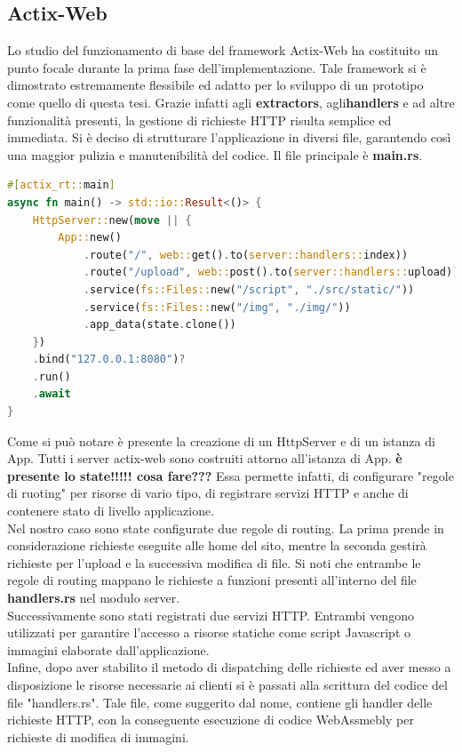 \subsection{Actix-Web}
Lo studio del funzionamento di base del framework Actix-Web ha costituito un punto focale durante la prima fase dell'implementazione.
Tale framework si è dimostrato estremamente flessibile ed adatto per lo sviluppo di un prototipo come quello di questa tesi. Grazie infatti agli \textbf{extractors}, agli\textbf{handlers} e ad altre funzionalità presenti, la gestione di richieste HTTP risulta semplice ed immediata.
Si è deciso di strutturare l'applicazione in diversi file, garantendo così una maggior pulizia e manutenibilità del codice. Il file principale è \textbf{main.rs}.
\begin{lstlisting}[language=rust, label=lst:RustWasi, caption={Porzione del file main.rs}, showstringspaces=false]
#[actix_rt::main]
async fn main() -> std::io::Result<()> {
    HttpServer::new(move || {
        App::new()
            .route("/", web::get().to(server::handlers::index))
            .route("/upload", web::post().to(server::handlers::upload))
            .service(fs::Files::new("/script", "./src/static/"))
            .service(fs::Files::new("/img", "./img/"))
            .app_data(state.clone())
    })
    .bind("127.0.0.1:8080")?
    .run()
    .await
}
\end{lstlisting}
Come si può notare è presente la creazione di un HttpServer e di un istanza di App. Tutti i server actix-web sono costruiti attorno all'istanza di App.
\textbf{è presente lo state!!!!! cosa fare???} Essa permette infatti, di configurare "regole di ruoting" per risorse di vario tipo, di registrare servizi HTTP e anche di contenere stato di livello applicazione. 
\\Nel nostro caso sono state configurate due regole di routing. La prima prende in considerazione richieste eseguite alle home del sito, mentre la seconda gestirà richieste per l'upload e la successiva modifica di file. Si noti che entrambe le regole di routing mappano le richieste a funzioni presenti all'interno del file \textbf{handlers.rs} nel modulo server.
\\Successivamente sono stati registrati due servizi HTTP. Entrambi vengono utilizzati per garantire l'accesso a risorse statiche come script Javascript o immagini elaborate dall'applicazione.
\\Infine, dopo aver stabilito il metodo di dispatching delle richieste ed aver messo a disposizione le risorse necessarie ai clienti si è passati alla scrittura del codice del file "handlers.rs". Tale file, come suggerito dal nome, contiene gli handler delle richieste HTTP, con la conseguente esecuzione di codice WebAssmebly per richieste di modifica di immagini.

